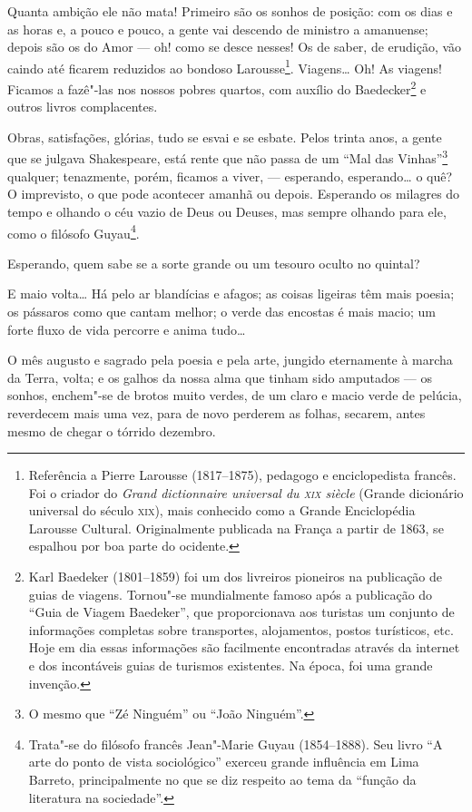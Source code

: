 Quanta ambição ele não mata! Primeiro são os sonhos de posição: com os
dias e as horas e, a pouco e pouco, a gente vai descendo de ministro a
amanuense; depois são os do Amor --- oh! como se desce nesses! Os de
saber, de erudição, vão caindo até ficarem reduzidos ao bondoso
Larousse\footnote{Referência a Pierre Larousse (1817--1875), pedagogo
  e enciclopedista francês. Foi o criador do \emph{Grand dictionnaire
  universal du \textsc{xix} siècle} (Grande dicionário universal do século \textsc{xix}),
  mais conhecido como a Grande Enciclopédia Larousse Cultural.
  Originalmente publicada na França a partir de 1863, se espalhou por
  boa parte do ocidente.}. Viagens\ldots{} Oh! As viagens! Ficamos a
fazê"-las nos nossos pobres quartos, com auxílio do Baedecker\footnote{Karl
  Baedeker (1801--1859) foi um dos livreiros pioneiros na publicação
  de guias de viagens. Tornou"-se mundialmente famoso após a publicação
  do ``Guia de Viagem Baedeker'', que proporcionava aos turistas um
  conjunto de informações completas sobre transportes, alojamentos,
  postos turísticos, etc. Hoje em dia essas informações são facilmente
  encontradas através da internet e dos incontáveis guias de turismos
  existentes. Na época, foi uma grande invenção.} e outros livros
complacentes.

Obras, satisfações, glórias, tudo se esvai e se esbate. Pelos trinta
anos, a gente que se julgava Shakespeare, está rente que não passa de um
``Mal das Vinhas''\footnote{O mesmo que ``Zé Ninguém'' ou ``João
  Ninguém''.} qualquer; tenazmente, porém, ficamos a viver, ---
esperando, esperando\ldots{} o quê? O imprevisto, o que pode acontecer
amanhã ou depois. Esperando os milagres do tempo e olhando o céu vazio
de Deus ou Deuses, mas sempre olhando para ele, como o filósofo
Guyau\footnote{Trata"-se do filósofo francês Jean"-Marie Guyau (1854--1888). Seu livro ``A arte do ponto de vista sociológico'' exerceu
  grande influência em Lima Barreto, principalmente no que se diz
  respeito ao tema da ``função da literatura na sociedade''.}.

Esperando, quem sabe se a sorte grande ou um tesouro oculto no quintal?

E maio volta\ldots{} Há pelo ar blandícias e afagos; as coisas ligeiras
têm mais poesia; os pássaros como que cantam melhor; o verde das
encostas é mais macio; um forte fluxo de vida percorre e anima
tudo\ldots{}

O mês augusto e sagrado pela poesia e pela arte, jungido eternamente à
marcha da Terra, volta; e os galhos da nossa alma que tinham sido
amputados --- os sonhos, enchem"-se de brotos muito verdes, de um claro e
macio verde de pelúcia, reverdecem mais uma vez, para de novo perderem
as folhas, secarem, antes mesmo de chegar o tórrido dezembro.

